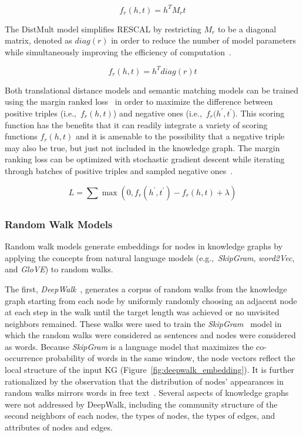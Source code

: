 \begin{equation}\label{eq:rescal_scoring_function}
    f_r(h,t) = h^{T} M_{r} t
\end{equation}

The DistMult model simplifies RESCAL by restricting $M_r$ to be a diagonal matrix, denoted as $diag(r)$ in order to reduce the number of model parameters while simultaneously improving the efficiency of computation~\cite{Yang2014}.

\begin{equation} \label{eq:distmult_scoring_function}
    f_r(h,t) = h^{T} diag(r) t
\end{equation}

Both translational distance models and semantic matching models can be trained using the margin ranked loss~\cite{Nickel2016,Dettmers2017} in order to maximize the difference between positive triples (i.e.,~$f_r(h,t)$) and negative ones (i.e.,~$f_r(h^{'},t^{'}$).
This scoring function has the benefits that it can readily integrate a variety of scoring functions $f_r(h, t)$ and it is amenable to the possibility that a negative triple may also be true, but just not included in the knowledge graph.
The margin ranking loss can be optimized with stochastic gradient descent while iterating through batches of positive triples and sampled negative ones~\cite{Bottou2010}.

\begin{equation}\label{eq:margin_ranked_loss}
    L = \sum_{}^{}\max(0, f_r(h^{'},t^{'}) - f_r(h,t) + \lambda)
\end{equation}

\subsubsection{Random Walk Models}

Random walk models generate embeddings for nodes in knowledge graphs by applying the concepts from natural language models (e.g.,~\textit{SkipGram}, \textit{word2Vec}, and \textit{GloVE}) to random walks.

The first, \textit{DeepWalk}~\cite{Perozzi2014}, generates a corpus of random walks from the knowledge graph starting from each node by uniformly randomly choosing an adjacent node at each step in the walk until the target length was achieved or no unvisited neighbors remained.
These walks were used to train the \textit{SkipGram}~\cite{Mikolov2013} model in which the random walks were considered as sentences and nodes were considered as words.
Because \textit{SkipGram} is a language model that maximizes the co-occurrence probability of words in the same window, the node vectors reflect the local structure of the input \ac{KG} (Figure~\ref{fig:deepwalk_embedding}).
It is further rationalized by the observation that the distribution of nodes' appearances in random walks mirrors words in free text~\cite{Perozzi2014}.
Several aspects of knowledge graphs were not addressed by DeepWalk, including the community structure of the second neighbors of each nodes, the types of nodes, the types of edges, and attributes of nodes and edges.

